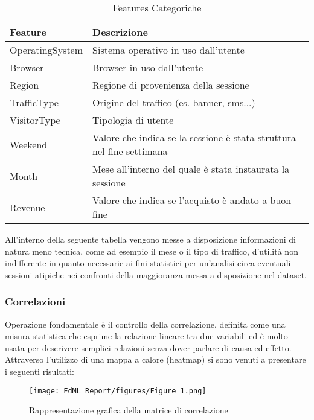 \documentclass[10pt,a4paper]{article}
\begin{document}
\begin{table}[h] 
\centering
\begin{tabular}{l l}
\hline
\textbf{Feature} & \textbf{Descrizione}\\
\hline
OperatingSystem & Sistema operativo in uso dall'utente \\
Browser & Browser in uso dall'utente \\
Region & Regione di provenienza della sessione \\
TrafficType & Origine del traffico (es. banner, sms...) \\
VisitorType & Tipologia di utente \\
Weekend & Valore che indica se la sessione è stata struttura nel fine settimana \\
Month & Mese all'interno del quale è stata instaurata la sessione \\
Revenue & Valore che indica se l'acquisto è andato a buon fine \\
\hline
\end{tabular}
\caption{Features Categoriche}
\label{tab:example}
\end{table}
\break
All'interno della seguente tabella vengono messe a disposizione informazioni di natura meno tecnica, come ad esempio il mese o il tipo di traffico, d'utilità non indifferente in quanto necessarie ai fini statistici per un'analisi circa eventuali sessioni atipiche nei confronti della maggioranza messa a disposizione nel dataset.

\subsubsection{Correlazioni}
Operazione fondamentale è il controllo della correlazione, definita come una misura statistica che esprime la relazione lineare tra due variabili ed è molto usata per descrivere semplici relazioni senza dover parlare di causa ed effetto. Attraverso l'utilizzo di una mappa a calore (heatmap) si sono venuti a presentare i seguenti risultati:

\begin{figure}[ht]
    \centering\texttt{[image: FdML\_Report/figures/Figure\_1.png]}
    \caption{Rappresentazione grafica della matrice di correlazione}
    \label{fig:example}
\end{figure}
\end{document}
